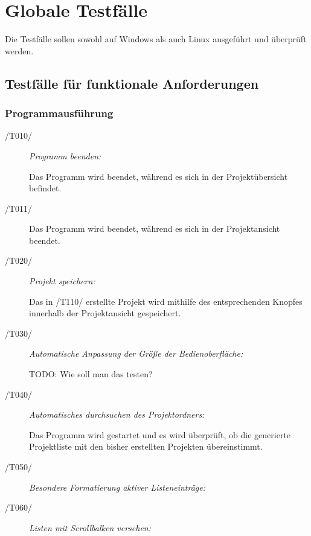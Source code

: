 \section{Globale Testfälle}

Die Testfälle sollen sowohl auf Windows als auch Linux ausgeführt und überprüft werden.


\subsection{Testfälle für funktionale Anforderungen}
	
	\subsubsection{Programmausführung}
	
		\begin{description}

			\item[/T010/] \textit{Programm beenden:}\par Das Programm wird beendet, während es sich in der Projektübersicht befindet.
			\item[/T011/] Das Programm wird beendet, während es sich in der Projektansicht beendet.
				
			\item[/T020/] \textit{Projekt speichern:}\par Das in /T110/ erstellte Projekt wird mithilfe des entsprechenden Knopfes innerhalb der Projektansicht gespeichert. 
				
			\item[/T030/] \textit{Automatische Anpassung der Größe der Bedienoberfläche:}\par TODO: Wie soll man das testen?	
			
			\item[/T040/] \textit{Automatisches durchsuchen des Projektordners:}\par Das Programm wird gestartet und es wird überprüft, ob die generierte Projektliste mit den bisher erstellten Projekten übereinstimmt.
		
			\item[/T050/] \textit{Besondere Formatierung aktiver Listeneinträge:}\par
			
			\item[/T060/] \textit{Listen mit Scrollbalken versehen:}\par
			
		\end{description}

